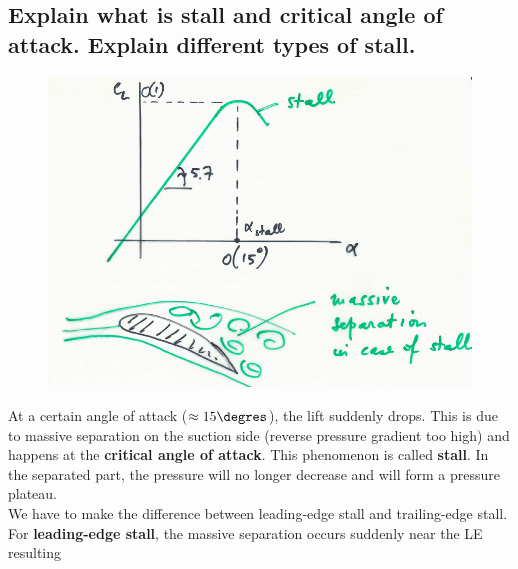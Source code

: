 \documentclass[british,french,11pt, a4paper, openany]{article}
\begin{document}
\subsection{Explain what is stall and critical angle of attack. Explain different types of stall.}
\begin{figure}
	\vspace{-5mm}
	\includegraphics[scale=0.16]{ch2/18}
\end{figure}
At a certain angle of attack ($\approx 15\degres$), the lift suddenly drops. This is due to massive separation on the suction side (reverse pressure gradient too high) and happens at the \textbf{critical angle of attack}. This phenomenon is called \textbf{stall}. In the separated part, the pressure will no longer decrease and will form a pressure plateau. \\

We have to make the difference between leading-edge stall and trailing-edge stall. For \textbf{leading-edge stall}, the massive separation occurs suddenly near the LE resulting \newpage
\end{document}
